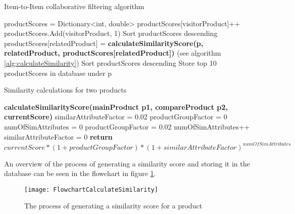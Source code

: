 \begin{algorithm}[H]
\caption{Item-to-Item collaborative filtering algorithm}
\label{alg:collaborativeFilter}
\begin{algorithmic}[1]
\State productScores = Dictionary<int, double>
\State productScores[visitorProduct]++
\Else
\State productScores.Add(visitorProduct, 1)
\EndIf
\EndFor
\EndFor
\State Sort productScores descending
\State productScores[relatedProduct] =
\State \textbf{calculateSimilarityScore(p, relatedProduct, productScores[relatedProduct])} (see algorithm \ref{alg:calculateSimilarity})
\EndFor
\State Sort productScores descending
\State Store top 10 productScores in database under p
\EndFor
\end{algorithmic}
\end{algorithm}

\begin{algorithm}[H]
\caption{Similarity calculations for two products }
\label{alg:calculateSimilarity}
\begin{algorithmic}[1]

\State \textbf{calculateSimilarityScore(mainProduct p1, compareProduct p2, currentScore)}
\State similarAttributeFactor = 0.02
\State productGroupFactor = 0
\State numOfSimAttributes = 0
\State productGroupFactor = 0.02
\EndIf
{}
\State numOfSimAttributes++
\EndIf
\EndFor
{}
\State similarAttributeFactor = 0
\EndIf
\State \textbf{return} \begin{math} currentScore * (1+productGroupFactor)*(1+similarAttributeFactor)^{numOfSimAttributes} \end{math}
\end{algorithmic}
\end{algorithm}

An overview of the process of generating a similarity score and storing it in the database can be seen in the flowchart in figure \ref{flowChartSimilarity}.

\begin{figure}[H]
\centering
\texttt{[image: FlowchartCalculateSimilarity]}
\caption{The process of generating a similarity score for a product}
\label{flowChartSimilarity}
\end{figure}

